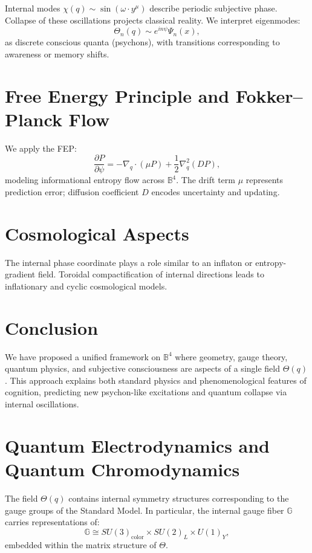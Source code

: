 \documentclass[12pt]{article}
\begin{document}
Internal modes \( \chi(q) \sim \sin(\omega \cdot y^\mu) \) describe periodic subjective phase. Collapse of these oscillations projects classical reality. We interpret eigenmodes:
\[
\Theta_n(q) \sim e^{i n \psi} \Psi_n(x),
\]
as discrete conscious quanta (psychons), with transitions corresponding to awareness or memory shifts.

\section{Free Energy Principle and Fokker–Planck Flow}

We apply the FEP:
\[
\frac{\partial P}{\partial \psi} = -\nabla_q \cdot (\mu P) + \frac{1}{2} \nabla_q^2 (D P),
\]
modeling informational entropy flow across \( \mathbb{B}^4 \). The drift term $\mu$ represents prediction error; diffusion coefficient $D$ encodes uncertainty and updating.

\section{Cosmological Aspects}

The internal phase coordinate plays a role similar to an inflaton or entropy-gradient field. Toroidal compactification of internal directions leads to inflationary and cyclic cosmological models.

\section{Conclusion}

We have proposed a unified framework on \( \mathbb{B}^4 \) where geometry, gauge theory, quantum physics, and subjective consciousness are aspects of a single field \( \Theta(q) \). This approach explains both standard physics and phenomenological features of cognition, predicting new psychon-like excitations and quantum collapse via internal oscillations.


\section{Quantum Electrodynamics and Quantum Chromodynamics}

The field \( \Theta(q) \) contains internal symmetry structures corresponding to the gauge groups of the Standard Model. In particular, the internal gauge fiber \( \mathbb{G} \) carries representations of:
\[
\mathbb{G} \cong SU(3)_\text{color} \times SU(2)_L \times U(1)_Y,
\]
embedded within the matrix structure of \( \Theta \).
\end{document}

